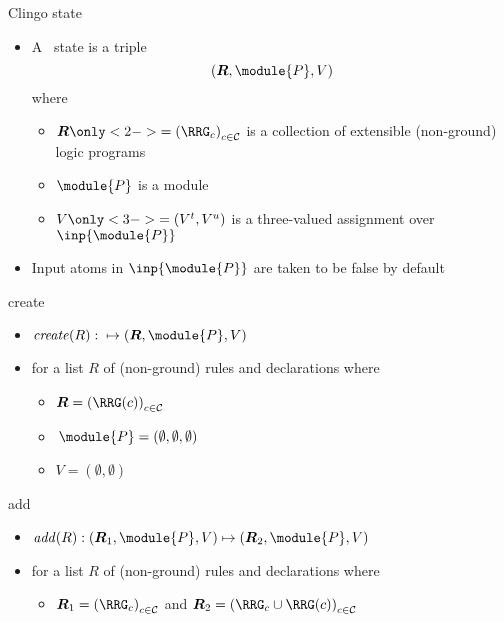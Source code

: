 \begin{frame}{Clingo state}
  \begin{itemize}
  \item<1-> A \alert{\clingo\ state} is a triple
    \[
    ( \boldsymbol{R},\module{P},V )
    \]
    where

    \begin{itemize}\normalsize
    \item $\boldsymbol{R}\only<2->{=\left(\RRG_c\right)_{c\in\mathcal{C}}}$ is a collection of extensible (non-ground) logic programs
      \smallskip
    \item $\module{P}$ is a module
      \smallskip
    \item $V\only<3->{=( V^t,V^u )}$ is a three-valued assignment over $\inp{\module{P}}$
    \end{itemize}
    \medskip
  \item<only@4->  Input atoms in $\inp{\module{P}}$ are taken to be false by default
  \end{itemize}
\end{frame}
\begin{frame}{create}
  \begin{itemize}
  \item $\mathit{create}(R): {} \mapsto ( \boldsymbol{R},\module{P},V )$
    \smallskip
  \item []
    for a list $R$ of (non-ground) rules and declarations
    \pause[2]%
    where
    \smallskip
    \begin{itemize}\normalsize
    \item $\boldsymbol{R}=\left(\RRG(c)\right)_{c\in\mathcal{C}}$
    \item $\,\module{P} = (\emptyset,\emptyset,\emptyset)$
    \item $V=(\emptyset,\emptyset)$
    \end{itemize}
  \end{itemize}
\end{frame}
\begin{frame}{add}
  \begin{itemize}
  \item $\mathit{add}(R): ( \boldsymbol{R}_1,\module{P},V )\mapsto( \boldsymbol{R}_2,\module{P},V )$
    \smallskip
  \item []
    for a list $R$ of (non-ground) rules and declarations
    \pause[2]%
    where
    \smallskip
    \begin{itemize}\normalsize
    \item $\boldsymbol{R}_1=\left(\RRG_c\right)_{c\in\mathcal{C}}$ and
          $\boldsymbol{R}_2=\left(\RRG_c\cup\RRG(c)\right)_{c\in\mathcal{C}}$
    \end{itemize}
  \end{itemize}
\end{frame}

